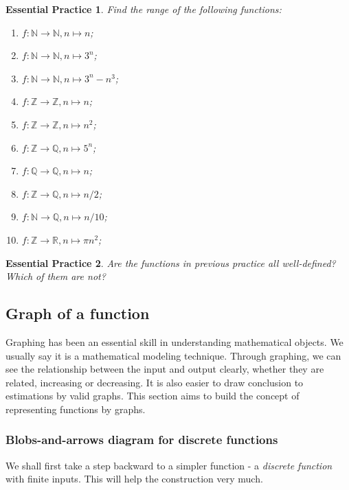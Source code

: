 \documentclass[12pt]{article}
\newtheorem{exercise}{Essential Practice}[subsection]
\begin{document}
    \begin{exercise}
        Find the range of the following functions:\begin{enumerate}
            \item $f:\mathbb{N}\to\mathbb{N}, n\mapsto n$;
            \item $f:\mathbb{N}\to\mathbb{N}, n\mapsto 3^n$;
            \item $f:\mathbb{N}\to\mathbb{N}, n\mapsto 3^n-n^3$;
            \item $f:\mathbb{Z}\to\mathbb{Z}, n\mapsto n$;
            \item $f:\mathbb{Z}\to\mathbb{Z}, n\mapsto n^2$;
            \item $f:\mathbb{Z}\to\mathbb{Q}, n\mapsto 5^n$;
            \item $f:\mathbb{Q}\to\mathbb{Q}, n\mapsto n$;
            \item $f:\mathbb{Z}\to\mathbb{Q}, n\mapsto n/2$;
            \item $f:\mathbb{N}\to\mathbb{Q}, n\mapsto n/10$;
            \item $f:\mathbb{Z}\to\mathbb{R}, n\mapsto \pi n^2$;
        \end{enumerate}
    \end{exercise}

    \begin{exercise}
        Are the functions in previous practice all well-defined? Which of them are not?
    \end{exercise}

    \subsection{Graph of a function}

    Graphing has been an essential skill in understanding mathematical objects. We usually say it is a mathematical modeling technique. Through graphing, we can see the relationship between the input and output clearly, whether they are related, increasing or decreasing. It is also easier to draw conclusion to estimations by valid graphs. This section aims to build the concept of representing functions by graphs.

    \subsubsection*{Blobs-and-arrows diagram for discrete functions}

    We shall first take a step backward to a simpler function - a \textit{discrete function} with finite inputs. This will help the construction very much.
\end{document}
